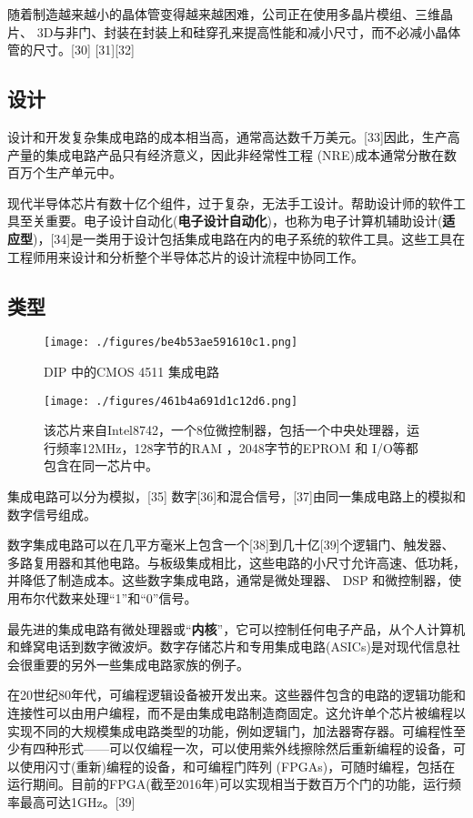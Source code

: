 随着制造越来越小的晶体管变得越来越困难，公司正在使用多晶片模组、三维晶片、 3D与非门、封装在封装上和硅穿孔来提高性能和减小尺寸，而不必减小晶体管的尺寸。[30] [31][32]

\subsection{设计}

设计和开发复杂集成电路的成本相当高，通常高达数千万美元。[33]因此，生产高产量的集成电路产品只有经济意义，因此非经常性工程 (NRE)成本通常分散在数百万个生产单元中。

现代半导体芯片有数十亿个组件，过于复杂，无法手工设计。帮助设计师的软件工具至关重要。电子设计自动化(\textbf{电子设计自动化})，也称为电子计算机辅助设计(\textbf{适应型})，[34]是一类用于设计包括集成电路在内的电子系统的软件工具。这些工具在工程师用来设计和分析整个半导体芯片的设计流程中协同工作。

\subsection{类型}

\begin{figure}[ht]
\centering
\texttt{[image: ./figures/be4b53ae591610c1.png]}
\caption{DIP 中的CMOS 4511 集成电路} \label{fig_icJCDL_3}
\end{figure}

\begin{figure}[ht]
\centering
\texttt{[image: ./figures/461b4a691d1c12d6.png]}
\caption{该芯片来自Intel8742，一个8位微控制器，包括一个中央处理器，运行频率12MHz，128字节的RAM ，2048字节的EPROM 和 I/O等都包含在同一芯片中。} \label{fig_icJCDL_4}
\end{figure}

集成电路可以分为模拟，[35] 数字[36]和混合信号，[37]由同一集成电路上的模拟和数字信号组成。

数字集成电路可以在几平方毫米上包含一个[38]到几十亿[39]个逻辑门、触发器、多路复用器和其他电路。与板级集成相比，这些电路的小尺寸允许高速、低功耗，并降低了制造成本。这些数字集成电路，通常是微处理器、 DSP 和微控制器，使用布尔代数来处理“1”和“0”信号。

最先进的集成电路有微处理器或“\textbf{内核}”，它可以控制任何电子产品，从个人计算机和蜂窝电话到数字微波炉。数字存储芯片和专用集成电路(ASICs)是对现代信息社会很重要的另外一些集成电路家族的例子。

在20世纪80年代，可编程逻辑设备被开发出来。这些器件包含的电路的逻辑功能和连接性可以由用户编程，而不是由集成电路制造商固定。这允许单个芯片被编程以实现不同的大规模集成电路类型的功能，例如逻辑门，加法器寄存器。可编程性至少有四种形式——可以仅编程一次，可以使用紫外线擦除然后重新编程的设备，可以使用闪寸(重新)编程的设备，和可编程门阵列 (FPGAs)，可随时编程，包括在运行期间。目前的FPGA(截至2016年)可以实现相当于数百万个门的功能，运行频率最高可达1GHz。[39]

